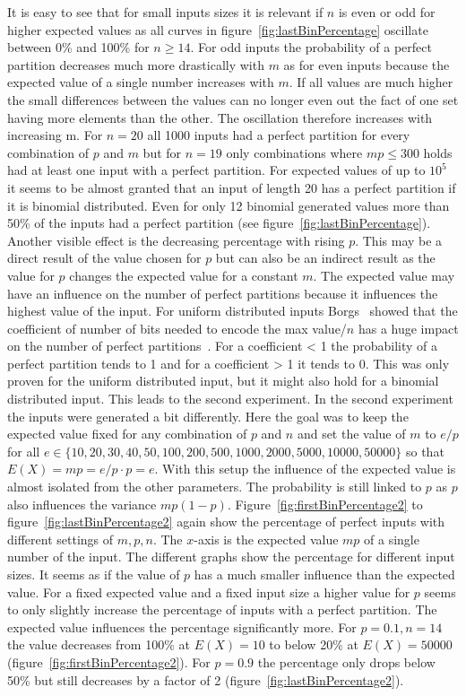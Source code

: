 It is easy to see that for small inputs sizes it is relevant if $n$ is even or odd for higher expected values as all curves in figure~\ref{fig:lastBinPercentage} oscillate between 0\% and 100\% for $n\ge14$.
For odd inputs the probability of a perfect partition decreases much more drastically with $m$ as for even inputs because the expected value of a single number increases with $m$.
If all values are much higher the small differences between the values can no longer even out the fact of one set having more elements than the other.
The oscillation therefore increases with increasing m.
For $n=20$ all 1000 inputs had a perfect partition for every combination of $p$ and $m$ but for $n=19$ only combinations where $mp\le300$ holds had at least one input with a perfect partition.
For expected values of up to $10^5$ it seems to be almost granted that an input of length 20 has a perfect partition if it is binomial distributed.
Even for only 12 binomial generated values more than 50\% of the inputs had a perfect partition (see figure~\ref{fig:lastBinPercentage}).
Another visible effect is the decreasing percentage with rising $p$.
This may be a direct result of the value chosen for $p$ but can also be an indirect result as the value for $p$ changes the expected value for a constant $m$.
The expected value may have an influence on the number of perfect partitions because it influences the highest value of the input.
For uniform distributed inputs Borgs \etal~showed that the coefficient of number of bits needed to encode the max value/$n$ has a huge impact on the number of perfect partitions~\cite{borgs2001phase}.
For a coefficient < 1 the probability of a perfect partition tends to 1 and for a coefficient > 1 it tends to 0.
This was only proven for the uniform distributed input, but it might also hold for a binomial distributed input.
This leads to the second experiment.\newline
In the second experiment the inputs were generated a bit differently.
Here the goal was to keep the expected value fixed for any combination of $p$ and $n$ and set the value of $m$ to $e/p$ for all $e \in \{10, 20, 30, 40, 50, 100, 200, 500, 1000, 2000, 5000, 10000, 50000\}$ so that $E(X)=mp=e/p\cdot p=e$.
With this setup the influence of the expected value is almost isolated from the other parameters.
The probability is still linked to $p$ as $p$ also influences the variance $mp(1-p)$.\newline
Figure~\ref{fig:firstBinPercentage2} to figure~\ref{fig:lastBinPercentage2} again show the percentage of perfect inputs with different settings of $m,p,n$.
The $x$-axis is the expected value $mp$ of a single number of the input. The different graphs show the percentage for different input sizes.
It seems as if the value of $p$ has a much smaller influence than the expected value.
For a fixed expected value and a fixed input size a higher value for $p$ seems to only slightly increase the percentage of inputs with a perfect partition.
The expected value influences the percentage significantly more.
For $p=0.1, n=14$ the value decreases from 100\% at $E(X)=10$ to below 20\% at $E(X)=50000$ (figure~\ref{fig:firstBinPercentage2}).
For $p=0.9$ the percentage only drops below 50\% but still decreases by a factor of 2 (figure~\ref{fig:lastBinPercentage2}).

